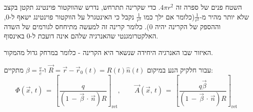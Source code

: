 \documentclass{tstextbook}
\begin{document}
\begin{remark}
השטח פנים של ספרה זה \(4\pi r^{2}\). כדי שקרינה תתרחש, נדרש שהווקטור פוינטינג תקטן בקצב שלא יותר מהיר מ-\(\frac{1}{r^{2}}\)(כלומר אם ילך כמו \(\frac{1}{r^{3}}\) נקבל כי האינטגרל על הווקטור פוינטינג ישאף ל-0, וההספק של הקרינה יהיה 0).  כלומר קרינה זה למעשה מתיחחס לגורמים של השדה האלקטרומגנטי שהאנרגיה שלהם אינה דועכת ל-0 באינסוף.

\end{remark}
\begin{definition}
האיזור שבו האנרגיה היחידה שנשאר היא הקרינה - כלומר במרחק גדול מהמקור.

\end{definition}
\begin{proposition}
עבור חלקיק הנע במיקום \(\vec{R}=\vec{r}-\vec{r}_{0}(t)=R(t)\hat{n}(t)\) ו-\(\beta=\frac{v}{c}\) מתקיים:
$$\Phi(\vec{x},\,t)\,=\,\left[{\frac{q}{(1\,-\,{\vec{\beta}}\,\cdot\,{\vec{n}})R}}\right]_{\mathrm{ret}},\qquad\vec{A}(\vec{x},\,t)\,=\,\left[{\frac{q{\vec{\beta}}}{(1\,-\,{\vec{\beta}}\,\cdot\,{\vec{n}})R}}\right]_{\mathrm{ret}}$$

\end{proposition}
\end{document}
